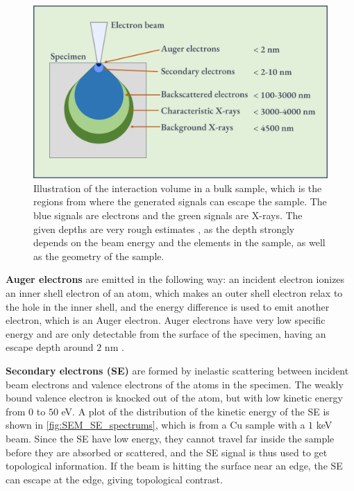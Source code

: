 \begin{figure}[ht]
    \centering
    \includegraphics[width=0.9\linewidth]{figures/interaction_volume.png}
    \caption{
        Illustration of the interaction volume in a bulk sample, which is the regions from where the generated signals can escape the sample.
        The blue signals are electrons and the green signals are X-rays.
        The given depths are very rough estimates \cite{goldstein_scanning_2018,hollas_modern_2004}, as the depth strongly depends on the beam energy and the elements in the sample, as well as the geometry of the sample.
    }
    \label{fig:interaction_volume}
\end{figure}



\textbf{Auger electrons} are emitted in the following way: an incident electron ionizes an inner shell electron of an atom, which makes an outer shell electron relax to the hole in the inner shell, and the energy difference is used to emit another electron, which is an Auger electron.
Auger electrons have very low specific energy and are only detectable from the surface of the specimen, having an escape depth around $2$ nm \cite{hollas_modern_2004}.


\textbf{Secondary electrons (SE)} are formed by inelastic scattering between incident beam electrons and valence electrons of the atoms in the specimen.
The weakly bound valence electron is knocked out of the atom, but with low kinetic energy from $0$ to $50$ eV.
A plot of the distribution of the kinetic energy of the SE is shown in \cref{fig:SEM_SE_spectrums}, which is from a Cu sample with a $1$ keV beam.
Since the SE have low energy, they cannot travel far inside the sample before they are absorbed or scattered, and the SE signal is thus used to get topological information.
If the beam is hitting the surface near an edge, the SE can escape at the edge, giving topological contrast.


